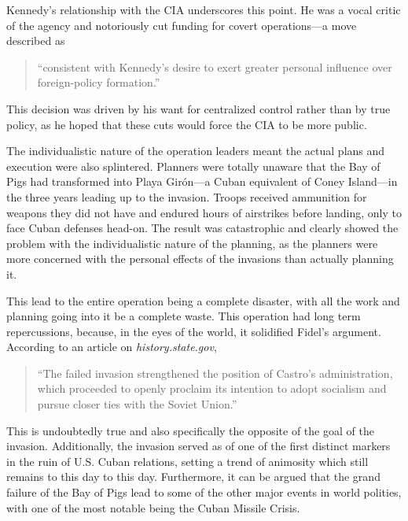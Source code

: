 \documentclass[12pt]{article}
\begin{document}
    Kennedy's relationship with the CIA underscores this point. He was a vocal critic of the agency and notoriously cut funding for covert operations—a move described as 
    
    \begin{quotation}
        ``consistent with Kennedy's desire to exert greater personal influence over foreign-policy formation.''~\parencite{JeffreysJones2003}
    \end{quotation}

    This decision was driven by his want for centralized control rather than by true policy, as he hoped that these cuts would force the CIA to be more public.

    The individualistic nature of the operation leaders meant the actual plans and execution were also splintered. Planners were totally unaware that the Bay of Pigs had transformed into Playa Girón—a Cuban equivalent of Coney Island—in the three years leading up to the invasion. \parencite{Wyden1979} Troops received ammunition for weapons they did not have and endured hours of airstrikes before landing, only to face Cuban defenses head-on. The result was catastrophic and clearly showed the problem with the individualistic nature of the planning, as the planners were more concerned with the personal effects of the invasions than actually planning it. 

    This lead to the entire operation being a complete disaster, with all the work and planning going into it be a complete waste. This operation had long term repercussions, because, in the eyes of the world, it solidified Fidel's argument. According to an article on \textit{history.state.gov}, 

    \begin{quotation}
        ``The failed invasion strengthened the position of Castro's administration, which proceeded to openly proclaim its intention to adopt socialism and pursue closer ties with the Soviet Union.'' \parencite{state_bayofpigs}
    \end{quotation}

    This is undoubtedly true and also specifically the opposite of the goal of the invasion. Additionally, the invasion served as of one of the first distinct markers in the ruin of U.S. Cuban relations, setting a trend of animosity which still remains to this day to this day. Furthermore, it can be argued that the grand failure of the Bay of Pigs lead to some of the other major events in world polities, with one of the most notable being the Cuban Missile Crisis. \parencite{cfr_uscuba} 
\end{document}
